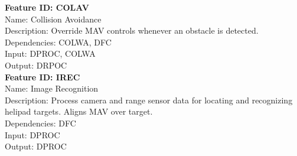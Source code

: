 \documentclass[onecolumn, oneside, letterpaper, draftclsnofoot, 10pt, compsoc]{IEEEtran}
\begin{document}
\noindent
\textbf{Feature ID: COLAV}\\
Name: Collision Avoidance\\
Description: Override MAV controls whenever an obstacle is detected.\\
Dependencies: COLWA, DFC\\
Input: DPROC, COLWA\\
Output: DRPOC\\

\noindent
\textbf{Feature ID: IREC}\\
Name: Image Recognition\\
Description: Process camera and range sensor data for locating and recognizing helipad targets. Aligns MAV over target.\\
Dependencies: DFC\\
Input: DPROC\\
Output: DPROC
\end{document}
